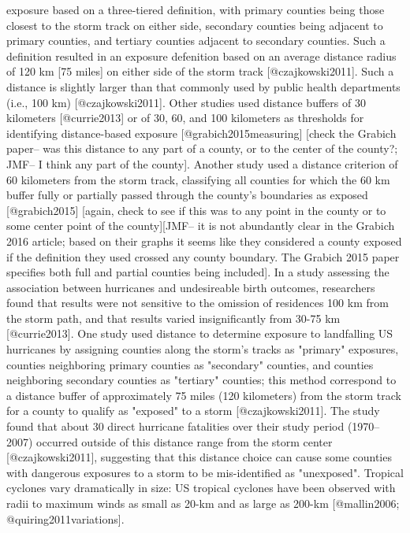 exposure based on a three-tiered definition, with primary counties being those
closest to the storm track on either side, secondary counties being adjacent to
primary counties, and tertiary counties adjacent to secondary counties. Such a
definition resulted in an exposure defenition based on an average distance
radius of 120 km [75 miles] on either side of the storm track [@czajkowski2011].
Such a distance is slightly larger than that commonly used by public health
departments (i.e., 100 km) [@czajkowski2011]. Other studies used distance
buffers of 30 kilometers [@currie2013] or of 30, 60, and 100 kilometers as
thresholds for identifying distance-based exposure [@grabich2015measuring] [check the
Grabich paper-- was this distance to any part of a county, or to the center of
the county?; JMF-- I think any part of the county]. Another study used a
distance criterion of 60 kilometers from the storm track, classifying all
counties for which the 60 km buffer fully or partially passed through the
county's boundaries as exposed [@grabich2015] [again, check to see if this was
to any point in the county or to some center point of the county][JMF-- it is
not abundantly clear in the Grabich 2016 article; based on their graphs it seems
like they considered a county exposed if the definition they used crossed any
county boundary. The Grabich 2015 paper specifies both full and partial counties
being included]. In a study assessing the association between hurricanes and
undesireable birth outcomes, researchers found that results were not sensitive
to the omission of residences 100 km from the storm path, and that results
varied insignificantly from 30-75 km [@currie2013]. One study used distance to
determine exposure to landfalling US hurricanes by assigning counties along the
storm's tracks as "primary" exposures, counties neighboring primary counties as
"secondary" counties, and counties neighboring secondary counties as "tertiary"
counties; this method correspond to a distance buffer of approximately 75 miles
(120 kilometers) from the storm track for a county to qualify as "exposed" to a
storm [@czajkowski2011]. The study found that about 30 direct hurricane
fatalities over their study period (1970--2007) occurred outside of this
distance range from the storm center [@czajkowski2011], suggesting that this
distance choice can cause some counties with dangerous exposures to a storm to
be mis-identified as "unexposed". Tropical cyclones vary dramatically in size:
US tropical cyclones have been observed with radii to maximum winds as small as
20-km and as large as 200-km [@mallin2006; @quiring2011variations].

